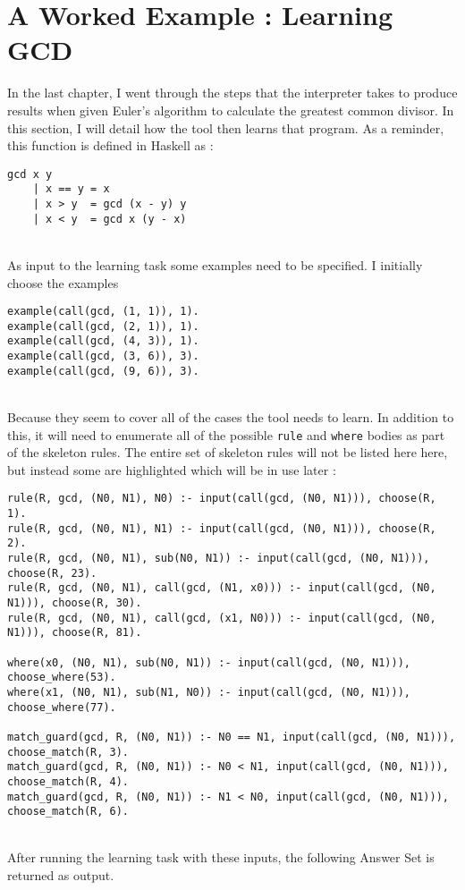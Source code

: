 \section{A Worked Example : Learning GCD}
In the last chapter, I went through the steps that the interpreter takes to produce results when given Euler's algorithm to calculate the greatest common divisor. In this section, I will detail how the tool then learns that program. As a reminder, this function is defined in Haskell as :

\begin{lstlisting}
gcd x y
	| x == y = x
	| x > y	 = gcd (x - y) y
	| x < y	 = gcd x (y - x)
\end{lstlisting}
\mbox{}\\
As input to the learning task some examples need to be specified. I initially choose the examples \\


\begin{lstlisting}
example(call(gcd, (1, 1)), 1).
example(call(gcd, (2, 1)), 1).
example(call(gcd, (4, 3)), 1).
example(call(gcd, (3, 6)), 3).
example(call(gcd, (9, 6)), 3).
\end{lstlisting}
\mbox{}\\
Because they seem to cover all of the cases the tool needs to learn. In addition to this, it will need to enumerate all of the possible \lstinline{rule} and \lstinline{where} bodies as part of the skeleton rules. The entire set of skeleton rules will not be listed here here, but instead some are highlighted which will be in use later : \\

\begin{lstlisting}
rule(R, gcd, (N0, N1), N0) :- input(call(gcd, (N0, N1))), choose(R, 1).
rule(R, gcd, (N0, N1), N1) :- input(call(gcd, (N0, N1))), choose(R, 2).
rule(R, gcd, (N0, N1), sub(N0, N1)) :- input(call(gcd, (N0, N1))), choose(R, 23).
rule(R, gcd, (N0, N1), call(gcd, (N1, x0))) :- input(call(gcd, (N0, N1))), choose(R, 30).
rule(R, gcd, (N0, N1), call(gcd, (x1, N0))) :- input(call(gcd, (N0, N1))), choose(R, 81).

where(x0, (N0, N1), sub(N0, N1)) :- input(call(gcd, (N0, N1))), choose_where(53).
where(x1, (N0, N1), sub(N1, N0)) :- input(call(gcd, (N0, N1))), choose_where(77).

match_guard(gcd, R, (N0, N1)) :- N0 == N1, input(call(gcd, (N0, N1))), choose_match(R, 3).
match_guard(gcd, R, (N0, N1)) :- N0 < N1, input(call(gcd, (N0, N1))), choose_match(R, 4).
match_guard(gcd, R, (N0, N1)) :- N1 < N0, input(call(gcd, (N0, N1))), choose_match(R, 6).
\end{lstlisting}
\mbox{}\\
After running the learning task with these inputs, the following Answer Set is returned as output. \\

